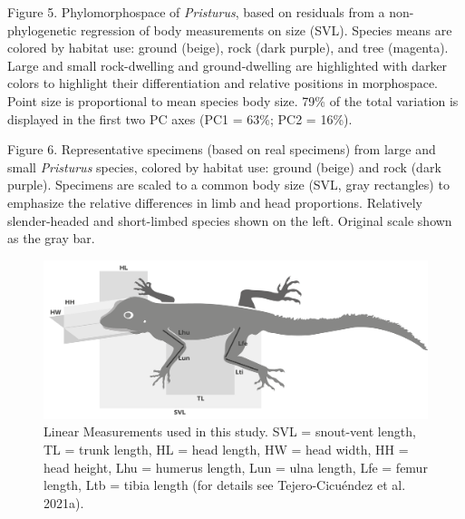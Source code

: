 \documentclass[
  11pt,
]{article}
\begin{document}
Figure 5. Phylomorphospace of \emph{Pristurus}, based on residuals from
a non-phylogenetic regression of body measurements on size (SVL).
Species means are colored by habitat use: ground (beige), rock (dark
purple), and tree (magenta). Large and small rock-dwelling and
ground-dwelling are highlighted with darker colors to highlight their
differentiation and relative positions in morphospace. Point size is
proportional to mean species body size. 79\% of the total variation is
displayed in the first two PC axes (PC1 = 63\%; PC2 = 16\%).

Figure 6. Representative specimens (based on real specimens) from large
and small \textit{Pristurus} species, colored by habitat use: ground
(beige) and rock (dark purple). Specimens are scaled to a common body
size (SVL, gray rectangles) to emphasize the relative differences in
limb and head proportions. Relatively slender-headed and short-limbed
species shown on the left. Original scale shown as the gray bar.

\newpage

\begin{figure}

{\centering \includegraphics[width=1\linewidth]{Figs/Fig1} 

}

\caption{Linear Measurements used in this study. SVL = snout-vent length, TL = trunk length, HL = head length, HW = head width, HH = head height, Lhu = humerus length, Lun = ulna length, Lfe = femur length, Ltb = tibia length (for details see Tejero-Cicu{\'{e}}ndez et al. 2021a).}\label{fig:unnamed-chunk-5}
\end{figure}

\newpage
\end{document}

